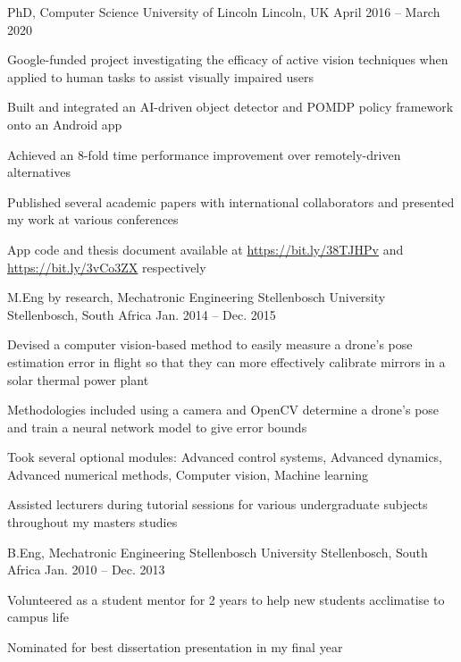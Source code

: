 \documentclass[11pt,a4paper]{awesome-cv}        %
\begin{document}
\begin{cventries}
  \cventry
  {PhD, Computer Science}
  {University of Lincoln}
  {Lincoln, UK}
  {April 2016 -- March 2020}
  {
    \begin{cvitems}
      \item Google-funded project investigating the efficacy of active vision techniques when applied to human tasks to assist visually impaired users
      \item Built and integrated an AI-driven object detector and POMDP policy framework onto an Android app
      \item Achieved an 8-fold time performance improvement over remotely-driven alternatives
      \item Published several academic papers with international collaborators and presented my work at various conferences
      \item App code and thesis document available at \url{https://bit.ly/38TJHPv} and \url{https://bit.ly/3vCo3ZX} respectively
    \end{cvitems}
  }
  \cventry
  {M.Eng by research, Mechatronic Engineering}
  {Stellenbosch University}
  {Stellenbosch, South Africa}
  {Jan. 2014 -- Dec. 2015}
  {
    \begin{cvitems}
      \item Devised a computer vision-based method to easily measure a drone's pose estimation error in flight so that they can more effectively calibrate mirrors in a solar thermal power plant
      \item Methodologies included using a camera and OpenCV determine a drone's pose and train a neural network model to give error bounds
      \item Took several optional modules: Advanced control systems, Advanced dynamics, Advanced numerical methods, Computer vision, Machine learning
      \item Assisted lecturers during tutorial sessions for various undergraduate subjects throughout my masters studies
    \end{cvitems}
  }
  \cventry
  {B.Eng, Mechatronic Engineering}
  {Stellenbosch University}
  {Stellenbosch, South Africa}
  {Jan. 2010 -- Dec. 2013}
  {
    \begin{cvitems}
      \item Volunteered as a student mentor for 2 years to help new students acclimatise to campus life
      \item Nominated for best dissertation presentation in my final year
    \end{cvitems}
  }  
\end{cventries}
\end{document}
